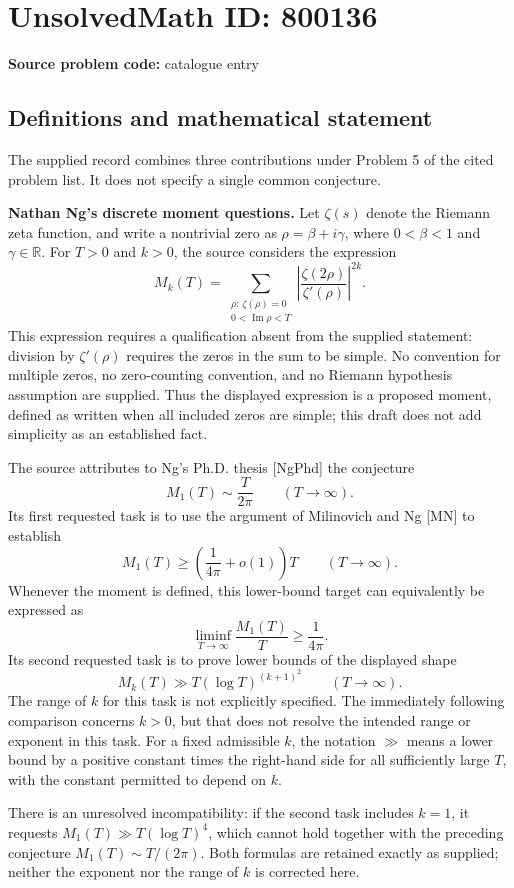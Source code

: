 \documentclass[11pt]{article}
\newcommand{\R}{\mathbb{R}}
\begin{document}
\section*{UnsolvedMath ID: 800136}
\textbf{Source problem code:} catalogue entry
\subsection{Definitions and mathematical statement}
The supplied record combines three contributions under Problem 5 of the cited problem list. It does not specify a single common conjecture.

\textbf{Nathan Ng's discrete moment questions.}
Let \(\zeta(s)\) denote the Riemann zeta function, and write a nontrivial zero as \(\rho=\beta+i\gamma\), where \(0<\beta<1\) and \(\gamma\in\R\). For \(T>0\) and \(k>0\), the source considers the expression
\[
M_k(T)=\sum_{\substack{\rho:\,\zeta(\rho)=0\\0<\operatorname{Im}\rho<T}}
\left|\frac{\zeta(2\rho)}{\zeta'(\rho)}\right|^{2k}.
\]
This expression requires a qualification absent from the supplied statement: division by \(\zeta'(\rho)\) requires the zeros in the sum to be simple. No convention for multiple zeros, no zero-counting convention, and no Riemann hypothesis assumption are supplied. Thus the displayed expression is a proposed moment, defined as written when all included zeros are simple; this draft does not add simplicity as an established fact.

The source attributes to Ng's Ph.D. thesis [NgPhd] the conjecture
\[
M_1(T)\sim\frac{T}{2\pi}\qquad(T\to\infty).
\]
Its first requested task is to use the argument of Milinovich and Ng [MN] to establish
\[
M_1(T)\geq\left(\frac{1}{4\pi}+o(1)\right)T
\qquad(T\to\infty).
\]
Whenever the moment is defined, this lower-bound target can equivalently be expressed as
\[
\liminf_{T\to\infty}\frac{M_1(T)}{T}\geq\frac{1}{4\pi}.
\]
Its second requested task is to prove lower bounds of the displayed shape
\[
M_k(T)\gg T(\log T)^{(k+1)^2}\qquad(T\to\infty).
\]
The range of \(k\) for this task is not explicitly specified. The immediately following comparison concerns \(k>0\), but that does not resolve the intended range or exponent in this task. For a fixed admissible \(k\), the notation \(\gg\) means a lower bound by a positive constant times the right-hand side for all sufficiently large \(T\), with the constant permitted to depend on \(k\).

There is an unresolved incompatibility: if the second task includes \(k=1\), it requests \(M_1(T)\gg T(\log T)^4\), which cannot hold together with the preceding conjecture \(M_1(T)\sim T/(2\pi)\). Both formulas are retained exactly as supplied; neither the exponent nor the range of \(k\) is corrected here.
\end{document}
